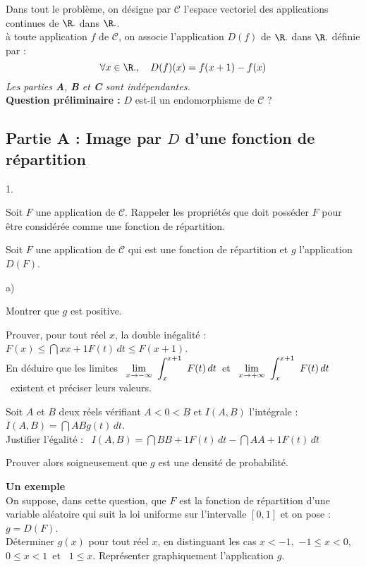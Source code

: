 \documentclass[11pt]{article}%
\begin{document}
Dans tout le problème, on désigne par $\mathcal{C}$ l'espace vectoriel
des
applications continues de $\R.$ dans $\R.$.\\
à toute application $f$ de $\mathcal{C}$, on associe l'application
$D(f)$ de 
$\R.$ dans $\R.$ définie par : 
\[
\forall x\in \R.,\quad D(f)(x) = f(x + 1)-f(x)
\]
\textit{Les parties \textbf{A}, \textbf{B} et \textbf{C} sont
indépendantes.}
\\
\textbf{Question préliminaire : } $D$ est-il un endomorphisme de
$\mathcal{C}
$ ?

\subsection*{Partie A : Image par $D$ d'une fonction de répartition}

\begin{noliste}{1.}
 \setlength{\itemsep}{4mm}
\item \label{R} Soit $F$ une application de $\mathcal{C}$. Rappeler les
propriétés que doit posséder $F$ pour être considérée comme une
fonction de répartition.

\item Soit $F$ une application de $\mathcal{C}$ qui est une fonction de
répartition et $g$ l'application $D(F)$.

\begin{noliste}{a)}
 \setlength{\itemsep}{2mm}
\item Montrer que $g$ est positive.

\item Prouver, pour tout réel $x$, la double inégalité : \quad\
$F(x)\leq \dint{x}{x + 1}F(t)\,dt\leq F(x + 1)$.\\
En déduire que les limites \ ${\displaystyle \lim_{x\rightarrow -\infty
} \ }\displaystyle \int_{x}^{x + 1}\ F(t)\,dt$\ et \ ${\displaystyle \lim_{x\rightarrow + \infty
} \ }\displaystyle \int_{x}^{x + 1}\ F(t)\,dt$\ existent et préciser leurs valeurs.

\item Soit $A$ et $B$ deux réels vérifiant $A<0<B$ et $I(A,B)$
l'intégrale : 
$I(A,B) = \dint{A}{B}g(t)\,dt$. \\
Justifier l'égalité : \quad\ $I(A,B) = \dint{B}{B +
1}F(t)\,dt-\dint{A}{A + 1}F(t)\,dt$\.

\item Prouver alors soigneusement que $g$ est une densité de
probabilité.
\end{noliste}

\item \textbf{Un exemple} \\
On suppose, dans cette question, que $F$ est la fonction de répartition
d'une variable aléatoire qui suit la loi uniforme sur l'intervalle
$[0,1]$
et on pose : $g = D(F)$.\\
Déterminer $g(x)$ pour tout réel $x$, en distinguant les cas $x<-1$,\
$-1\leq x<0$, \ $0\leq x<1$\ et \ $1\leq x$. Représenter
graphiquement l'application $g$.
\end{noliste}
\end{document}
